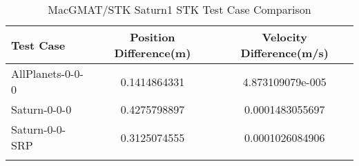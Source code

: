 \begin{table}[htbp!]
\centering
\caption{ MacGMAT/STK Saturn1 STK Test Case Comparison}
      \begin{tabular}{lcc}
      \hline\hline
          Test Case & Position Difference(m) & Velocity Difference(m/s) \\
         \hline
         AllPlanets-0-0-0 & 0.1414864331 & 4.873109079e-005 \\
         Saturn-0-0-0 & 0.4275798897 & 0.0001483055697 \\
         Saturn-0-0-SRP & 0.3125074555 & 0.0001026084906 \\
      \hline\hline
      \label{Table: Saturn1 STK Table} 
\end{tabular}
\end{table}
